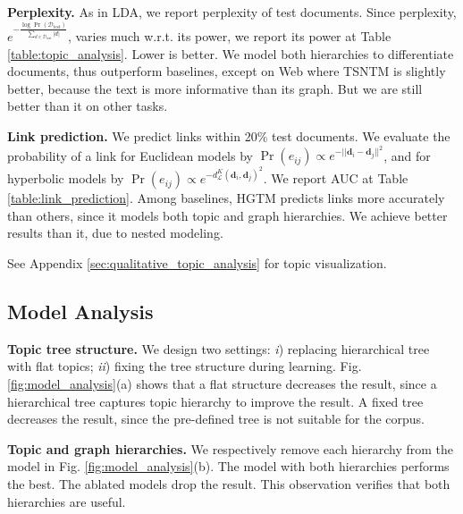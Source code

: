 \textbf{Perplexity.} As in LDA, we report perplexity of test documents. Since perplexity, $ e^{-\frac{\log \Pr(\mathcal{D}_{\text{test}})}{\sum_{d\in\mathcal{D}_{\text{test}}}|d|}} $, varies much w.r.t. its power, we report its power at Table \ref{table:topic_analysis}. Lower is better. We model both hierarchies to differentiate documents, thus outperform baselines, except on Web where TSNTM is slightly better, because the text is more informative than its graph. But we are still better than it on other tasks.

\textbf{Link prediction.} %
We predict links within 20\% test documents. We %
evaluate the probability of a link for Euclidean models by $ \Pr(e_{ij})\propto e^{-||\textbf{d}_i-\textbf{d}_j||^2}$, and for hyperbolic models by $ \Pr(e_{ij})\propto e^{-d_{\mathcal{L}}^K(\textbf{d}_i,\textbf{d}_j)^2}$. %
We report AUC at Table \ref{table:link_prediction}. %
Among baselines, HGTM predicts links more accurately than others, since it models both topic and graph hierarchies. We achieve better results than it, due to nested modeling. %

See Appendix \ref{sec:qualitative_topic_analysis} for topic visualization.

\subsection{Model Analysis}

\textbf{Topic tree structure.} We design two settings: \emph{i}) replacing hierarchical tree with flat topics; \emph{ii}) fixing the tree structure during learning. Fig. \ref{fig:model_analysis}(a) shows that a flat structure decreases the result, since a hierarchical tree captures topic hierarchy to improve the result. A fixed tree decreases the result, since the pre-defined tree is not suitable for the corpus. %

\textbf{Topic and graph hierarchies.} %
We respectively remove each hierarchy from the model in Fig. \ref{fig:model_analysis}(b). The model with both hierarchies performs the best. The ablated models %
drop the result. This observation verifies that both hierarchies are useful. %


